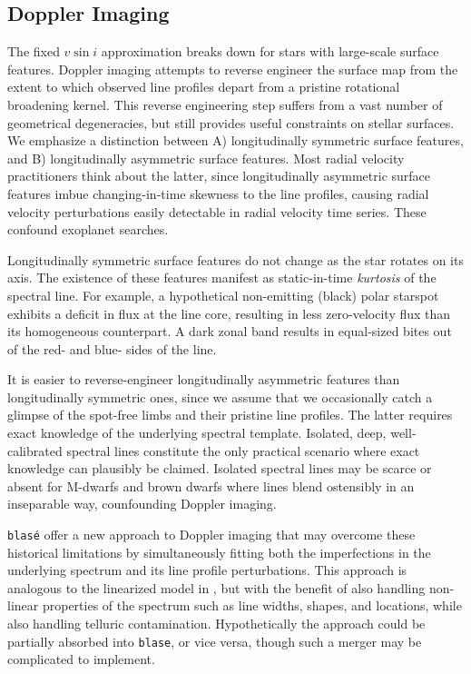 \documentclass[twocolumn]{aastex631}
\begin{document}
\subsection{Doppler Imaging}
The fixed $v\sin{i}$ approximation breaks down for stars with large-scale surface features.  Doppler imaging attempts to reverse engineer the surface map from the extent to which observed line profiles depart from a pristine rotational broadening kernel.  This reverse engineering step suffers from a vast number of geometrical degeneracies, but still provides useful constraints on stellar surfaces.  We emphasize a distinction between A) longitudinally symmetric surface features, and B) longitudinally asymmetric surface features.  Most radial velocity practitioners think about the latter, since longitudinally asymmetric surface features imbue changing-in-time skewness to the line profiles, causing radial velocity perturbations easily detectable in radial velocity time series.  These confound exoplanet searches.

Longitudinally symmetric surface features do not change as the star rotates on its axis.  The existence of these features manifest as static-in-time \emph{kurtosis} of the spectral line.  For example, a hypothetical non-emitting (black) polar starspot exhibits a deficit in flux at the line core, resulting in less zero-velocity flux than its homogeneous counterpart.  A dark zonal band results in equal-sized bites out of the red- and blue- sides of the line.

It is easier to reverse-engineer longitudinally asymmetric features than longitudinally symmetric ones, since we assume that we occasionally catch a glimpse of the spot-free limbs and their pristine line profiles.
The latter requires exact knowledge of the underlying spectral template.  Isolated, deep, well-calibrated spectral lines constitute the only practical scenario where exact knowledge can plausibly be claimed.  Isolated spectral lines may be scarce or absent for M-dwarfs and brown dwarfs where lines blend ostensibly in an inseparable way, counfounding Doppler imaging.

\texttt{blas\'e} offer a new approach to Doppler imaging that may overcome these historical limitations by simultaneously fitting both the imperfections in the underlying spectrum and its line profile perturbations.  This approach is analogous to the linearized model in \citet{2021arXiv211006271L}, but with the benefit of also handling non-linear properties of the spectrum such as line widths, shapes, and locations, while also handling telluric contamination.  Hypothetically the \citet{2021arXiv211006271L} approach could be partially absorbed into \texttt{blase}, or vice versa, though such a merger may be complicated to implement.
\end{document}
